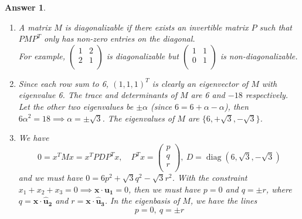 \documentclass[a4paper]{article}
\DeclareMathOperator{\diag}{diag}
\newtheorem{ans}{Answer}[section]
\theoremstyle{new}
\begin{document}
\begin{ans}\leavevmode
\begin{enumerate}[label=(\alph*)]
\item A matrix $M$ is diagonalizable if there exists an invertible matrix $P$ such that $PMP^T$ only has non-zero entries on the diagonal.\\[5pt]
For example, $\begin{pmatrix}1&2\\2&1\\\end{pmatrix}$ is diagonalizable but $\begin{pmatrix}1&1\\0&1\\\end{pmatrix}$ is non-diagonalizable.
\item Since each row sum to 6, $(1,1,1)^T$ is clearly an eigenvector of $M$ with eigenvalue 6. The trace and determinants of $M$ are 6 and $-18$ respectively. Let the other two eigenvalues be $\pm\alpha$ (since $6=6+\alpha-\alpha$), then $6\alpha^2=18\implies\alpha=\pm\sqrt{3}$. The eigenvalues of $M$ are $\{6,+\sqrt{3},-\sqrt{3}\}$.
\item We have 
$$0=x^TMx=x^TPDP^Tx,\quad P^Tx=\begin{pmatrix}p\\q\\r\\\end{pmatrix},~D=\diag(6,\sqrt{3},-\sqrt{3})$$
and we must have $0=6p^2+\sqrt{3}q^2-\sqrt{3}r^2$. With the constraint $x_1+x_2+x_3=0\implies\mathbf{x}\cdot\mathbf{u_1}=0$, then we must have $p=0$ and $q=\pm r$, where $q=\mathbf{x}\cdot\mathbf{\hat{u}_2}$ and $r=\mathbf{x}\cdot\mathbf{\hat{u}_3}$. In the eigenbasis of $M$, we have the lines 
$$p=0,~q=\pm r$$
\end{enumerate}
\end{ans}
\newpage
\end{document}
